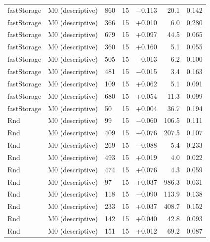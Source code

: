\begin{longtable}{@{}lllrrrr@{}}
fastStorage & M0 (descriptive) & 860 & 15 & $-$0.113 & 20.1 & 0.142 \\
fastStorage & M0 (descriptive) & 366 & 15 & +0.010 & 6.0 & 0.280 \\
fastStorage & M0 (descriptive) & 679 & 15 & +0.097 & 44.5 & 0.065 \\
fastStorage & M0 (descriptive) & 360 & 15 & +0.160 & 5.1 & 0.055 \\
fastStorage & M0 (descriptive) & 505 & 15 & $-$0.013 & 6.2 & 0.100 \\
fastStorage & M0 (descriptive) & 481 & 15 & $-$0.015 & 3.4 & 0.163 \\
fastStorage & M0 (descriptive) & 109 & 15 & +0.062 & 5.1 & 0.091 \\
fastStorage & M0 (descriptive) & 680 & 15 & +0.054 & 11.3 & 0.099 \\
fastStorage & M0 (descriptive) & 50 & 15 & +0.004 & 36.7 & 0.194 \\
Rnd & M0 (descriptive) & 99 & 15 & $-$0.060 & 106.5 & 0.111 \\
Rnd & M0 (descriptive) & 409 & 15 & $-$0.076 & 207.5 & 0.107 \\
Rnd & M0 (descriptive) & 269 & 15 & $-$0.088 & 5.4 & 0.233 \\
Rnd & M0 (descriptive) & 493 & 15 & +0.019 & 4.0 & 0.022 \\
Rnd & M0 (descriptive) & 474 & 15 & +0.076 & 4.3 & 0.059 \\
Rnd & M0 (descriptive) & 97 & 15 & +0.037 & 986.3 & 0.031 \\
Rnd & M0 (descriptive) & 118 & 15 & $-$0.090 & 113.9 & 0.138 \\
Rnd & M0 (descriptive) & 233 & 15 & +0.037 & 408.7 & 0.152 \\
Rnd & M0 (descriptive) & 142 & 15 & +0.040 & 42.8 & 0.093 \\
Rnd & M0 (descriptive) & 151 & 15 & +0.012 & 69.2 & 0.087 \\
\end{longtable}
\normalsize\setlength{\tabcolsep}{4pt}

